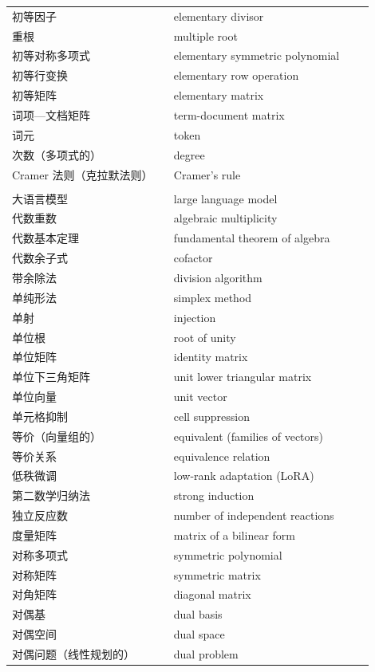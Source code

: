 {\begin{longtable}{p{0.42\linewidth}p{0.52\linewidth}}
		初等因子 & elementary divisor \\
		重根 & multiple root \\
		初等对称多项式 & elementary symmetric polynomial \\
		初等行变换 & elementary row operation \\
		初等矩阵 & elementary matrix \\
		词项—文档矩阵 & term-document matrix \\
		词元 & token \\
		次数（多项式的） & degree \\
		Cramer 法则（克拉默法则） & Cramer's rule \\
		\addlinespace
		\multicolumn{2}{l}{\textbf{\sffamily D}} \\
		大语言模型 & large language model \\
		代数重数 & algebraic multiplicity \\
		代数基本定理 & fundamental theorem of algebra \\
		代数余子式 & cofactor \\
		带余除法 & division algorithm \\
		单纯形法 & simplex method \\
		单射 & injection \\
		单位根 & root of unity \\
		单位矩阵 & identity matrix \\
		单位下三角矩阵 & unit lower triangular matrix \\
		单位向量 & unit vector \\
		单元格抑制 & cell suppression \\
		等价（向量组的） & equivalent (families of vectors) \\
		等价关系 & equivalence relation \\
		低秩微调 & low-rank adaptation (LoRA) \\
		第二数学归纳法 & strong induction \\
		独立反应数 & number of independent reactions \\
		度量矩阵 & matrix of a bilinear form \\
		对称多项式 & symmetric polynomial \\
		对称矩阵 & symmetric matrix \\
		对角矩阵 & diagonal matrix \\
		对偶基 & dual basis \\
		对偶空间 & dual space \\
		对偶问题（线性规划的） & dual problem \\

\end{longtable}}
